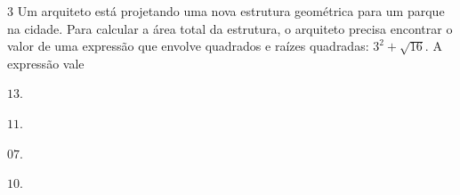 

\num{3} Um arquiteto está projetando uma nova estrutura geométrica para um
parque na cidade. Para calcular a área total da estrutura, o arquiteto precisa
encontrar o valor de uma expressão que envolve quadrados e raízes quadradas:
$3^2 + \sqrt{16}$. A expressão vale

\begin{escolha}
\item $13$.

\item $11$.

\item $07$.

\item $10$.
\end{escolha}




